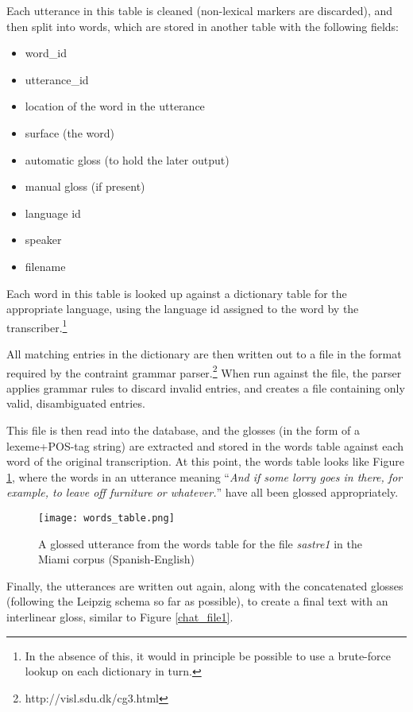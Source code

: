 \documentclass[11pt]{article}
\begin{document}
Each utterance in this table is cleaned (non-lexical markers are discarded), and then split into words, which are stored in another table with the following fields:
\begin{itemize}
\setlength{\itemsep}{-2mm}
\item word\_id
\item utterance\_id
\item location of the word in the utterance
\item surface (the word)
\item automatic gloss (to hold the later output)
\item manual gloss (if present)
\item language id
\item speaker
\item filename
\end{itemize}

Each word in this table is looked up against a dictionary table for the appropriate language, using the language id assigned to the word by the transcriber.\footnote{In the absence of this, it would in principle be possible to use a brute-force lookup on each dictionary in turn.}  

All matching entries in the dictionary are then written out to a file in the format required by the contraint grammar parser.\footnote{http://visl.sdu.dk/cg3.html}  When run against the file, the parser applies grammar rules to discard invalid entries, and creates a file containing only valid, disambiguated entries.

This file is then read into the database, and the glosses (in the form of a lexeme+POS-tag string) are extracted and stored in the words table against each word of the original transcription.  At this point, the words table looks like Figure \ref{words_db}, where the words in an utterance meaning ``\textit{And if some lorry goes in there, for example, to leave off furniture or whatever.}'' have all been glossed appropriately.

\begin{figure}
\centering
\texttt{[image: words\_table.png]}
\caption{A glossed utterance from the words table for the file \textit{sastre1} in the Miami corpus (Spanish-English)}
\label{words_db}
\end{figure}

Finally, the utterances are written out again, along with the concatenated glosses (following the Leipzig schema \cite{leipzig2008} so far as possible), to create a final text with an interlinear gloss, similar to Figure \ref{chat_file1}.
\end{document}
